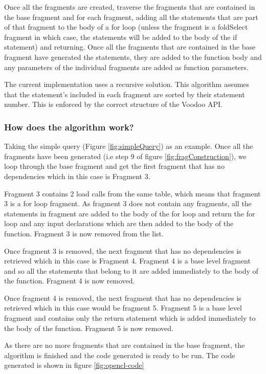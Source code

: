 Once all the fragments are created, traverse the fragments that are contained in the base fragment and for each fragment, adding all the statements that are part of that fragment to the body of a for loop (unless the fragment is a foldSelect fragment in which case, the statements will be added to the body of the if statement) and returning. Once all the fragments that are contained in the base fragment have generated the statements, they are added to the function body and any parameters of the individual fragments are added as function parameters.

The current implementation uses a recursive solution. This algorithm assumes that the statement's included in each fragment are sorted by their statement number. This is enforced by the correct structure of the Voodoo API.

\subsubsection{How does the algorithm work?}

Taking the simple query (Figure \ref{fig:simpleQuery}) as an example. Once all the fragments have been generated (i.e step 9 of figure \ref{fig:fragConstruction}), we loop through the base fragment and get the first fragment that has no dependencies which in this case is Fragment 3.

Fragment 3 contains 2 load calls from the same table, which means that fragment 3 is a for loop fragment. As fragment 3 does not contain any fragments, all the statements in fragment are added to the body of the for loop and return the for loop and any input declarations which are then added to the body of the function. Fragment 3 is now removed from the list.


Once fragment 3 is removed, the next fragment that has no dependencies is retrieved which in this case is Fragment 4. Fragment 4 is a base level fragment and so all the statements that belong to it are added immediately to the body of the function. Fragment 4 is now removed.

Once fragment 4 is removed, the next fragment that has no dependencies is retrieved which in this case would be fragment 5. Fragment 5 is a base level fragment and contains only the return statement which is added immediately to the body of the function. Fragment 5 is now removed.

As there are no more fragments that are contained in the base fragment, the algorithm is finished and the code generated is ready to be run. The code generated is shown in figure \ref{fig:opencl-code}


